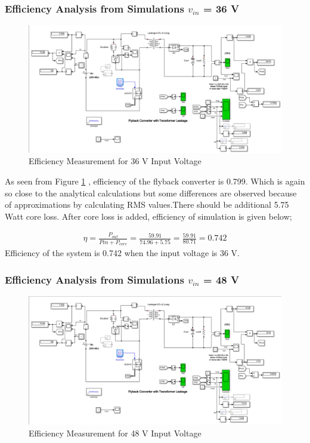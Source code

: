 \subsubsection{Efficiency Analysis from Simulations $v_{in}$ = 36 V}

\begin{figure}[H]
\begin{center}
\includegraphics[width=1\textwidth]{figures/36.PNG}
\caption{Efficiency Measurement for 36 V Input Voltage}
\label{fig:eff_36}
\end{center}
\end{figure}

As seen from Figure \ref{fig:eff_36} , efficiency of the flyback converter is 0.799. Which is again so close to the analytical calculations but some differences are observed because of approximations by calculating RMS values.There should be additional 5.75 Watt core loss. After core loss is added, efficiency of simulation is given below;

\begin{align}
    \eta = \frac{P_{out}}{P{in}+P_{core}} = \frac{59.91}{74.96+5.75} = \frac{59.91}{80.71} = 0.742
\end{align}
Efficiency of the system is 0.742 when the input voltage is 36 V.

\subsubsection{Efficiency Analysis from Simulations $v_{in}$ = 48 V}

\begin{figure}[H]
\begin{center}
\includegraphics[width=1\textwidth]{figures/48.PNG}
\caption{Efficiency Measurement for 48 V Input Voltage}
\label{fig:eff_48}
\end{center}
\end{figure}

